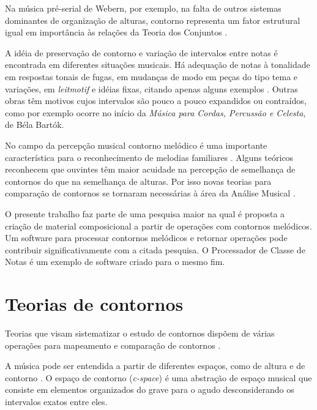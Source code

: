 \documentclass{article}
\newcommand{\eng}[1]{\textit{#1}}
\newcommand{\opus}[1]{\textit{#1}}
\begin{document}
Na música pré-serial de Webern, por exemplo, na falta de outros
sistemas dominantes de organização de alturas, contorno representa um
fator estrutural igual em importância às relações da Teoria dos
Conjuntos \cite[p. 157]{clifford95:contour}.

A idéia de preservação de contorno e variação de intervalos entre
notas é encontrada em diferentes situações musicais. Há adequação de
notas à tonalidade em respostas tonais de fugas, em mudanças de modo
em peças do tipo tema e variações, em \eng{leitmotif} e idéias fixas,
citando apenas alguns exemplos
\cite[p. 29]{morris87:composition}. Outras obras têm motivos cujos
intervalos são pouco a pouco expandidos ou contraídos, como por
exemplo ocorre no início da \opus{Música para Cordas, Percussão e
  Celesta}, de Béla Bartók.

No campo da percepção musical contorno melódico é uma importante
característica para o reconhecimento de melodias familiares
\cite[p. 136]{dowling.ea86:music}. Alguns teóricos reconhecem que
ouvintes têm maior acuidade na percepção de semelhança de contornos do
que na semelhança de alturas. Por isso novas teorias para comparação
de contornos se tornaram necessárias à área da Análise Musical
\cite[p. 226]{marvin.ea87:relating}.


O presente trabalho faz parte de uma pesquisa maior na qual é proposta
a criação de material composicional a partir de operações com
contornos melódicos. Um software para processar contornos melódicos e
retornar operações pode contribuir significativamente com a citada
pesquisa. O Processador de Classe de Notas \cite{oliveira01:pcn} é um
exemplo de software criado para o mesmo fim.

\section{Teorias de contornos}
\label{sec:teorias-de-contornos}

Teorias que visam sistematizar o estudo de contornos dispõem de várias
operações para mapeamento e comparação de contornos
\cite{friedmann85:methodology,friedmann87:response,morris87:composition,morris93:directions,marvin.ea87:relating,clifford95:contour,polansky.ea92:possible,quinn97:fuzzy,beard03:contour}.

A música pode ser entendida a partir de diferentes espaços, como de
altura e de contorno \cite{morris87:composition}. O espaço de contorno
(\eng{c-space}) é uma abstração de espaço musical que consiste em
elementos organizados do grave para o agudo desconsiderando os
intervalos exatos entre eles.
\end{document}
